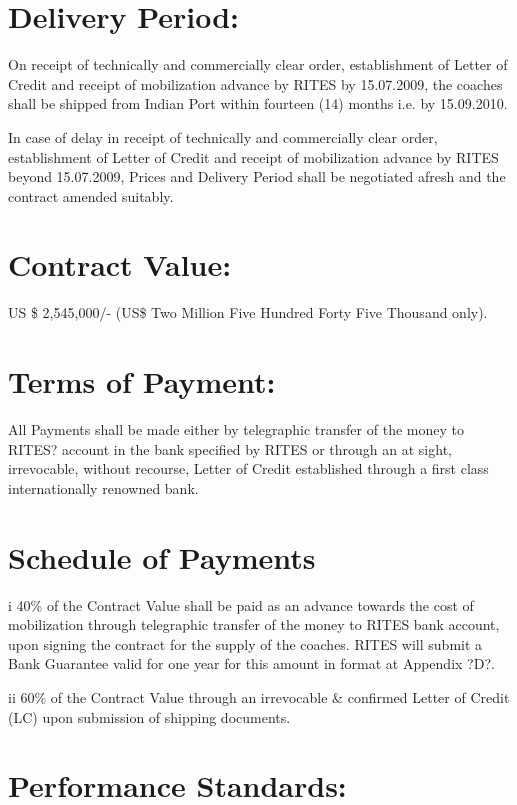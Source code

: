 \documentclass{standalone}
\begin{document}
\section{Delivery Period:}

On receipt of technically and commercially clear order, establishment of Letter of Credit and receipt of mobilization advance by RITES by 15.07.2009, the coaches shall be shipped from Indian Port within fourteen (14) months i.e. by 15.09.2010.

In case of delay in receipt of technically and commercially clear order, establishment of Letter of Credit and receipt of mobilization advance by RITES beyond 15.07.2009,  Prices and Delivery Period shall be negotiated afresh and the contract amended suitably.

\section{Contract  Value: }

US \$ 2,545,000/- (US\$ Two Million Five Hundred Forty Five Thousand only).


\section{Terms of  Payment:}

All Payments shall be made either by telegraphic transfer of the money to RITES? account in the bank specified by RITES or through an at sight, irrevocable, without recourse, Letter of Credit established through a first class internationally renowned bank.


\section{Schedule of Payments}

i 40\% of the Contract Value shall be paid as an advance towards the cost of mobilization through telegraphic transfer of the money to RITES bank account, upon   signing the contract for the supply of the coaches. RITES will submit a Bank Guarantee valid for one year for this amount in format at Appendix ?D?.

ii 60\% of the Contract Value through an irrevocable \& confirmed Letter of Credit (LC) upon submission of shipping documents.

\section{Performance Standards:}
\end{document}
